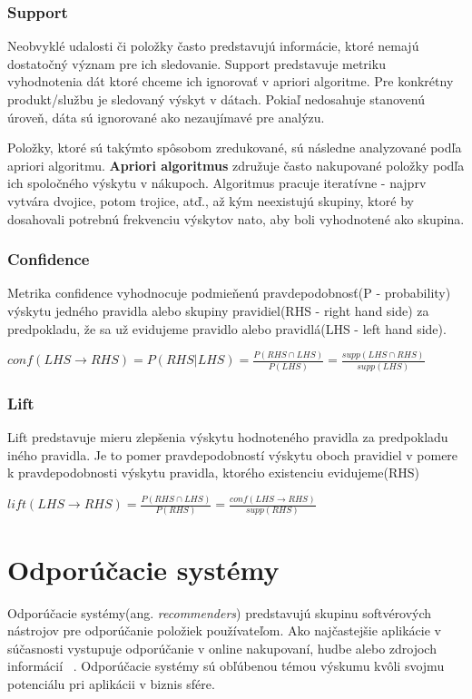\subsubsection{Support}
\label{support}
Neobvyklé udalosti či položky často predstavujú informácie, ktoré nemajú dostatočný význam pre ich sledovanie. Support predstavuje metriku vyhodnotenia dát ktoré chceme ich ignorovať v apriori algoritme. Pre konkrétny produkt/službu je sledovaný výskyt v dátach. Pokiaľ nedosahuje stanovenú úroveň, dáta sú ignorované ako nezaujímavé pre analýzu.

Položky, ktoré sú takýmto spôsobom zredukované, sú následne analyzované podľa apriori algoritmu. \textbf{Apriori algoritmus} združuje často nakupované položky podľa ich spoločného výskytu v nákupoch. Algoritmus pracuje iteratívne - najprv vytvára dvojice, potom trojice, atď., až kým neexistujú skupiny, ktoré by dosahovali potrebnú frekvenciu výskytov nato, aby boli vyhodnotené ako skupina.

\subsubsection{Confidence}
\label{confidence}
Metrika confidence vyhodnocuje podmieňenú pravdepodobnosť(P - probability) výskytu jedného pravidla alebo skupiny pravidiel(RHS - right hand side) za predpokladu, že sa už evidujeme pravidlo alebo pravidlá(LHS - left hand side).

$conf(LHS\to RHS) = P(RHS | LHS) = \frac{P(RHS \cap LHS)}{P(LHS)} = \frac{supp(LHS\cap RHS)}{supp(LHS)}$

\subsubsection{Lift}
\label{lift}
Lift predstavuje mieru zlepšenia výskytu hodnoteného pravidla za predpokladu iného pravidla. Je to pomer pravdepodobností výskytu oboch pravidiel v pomere k pravdepodobnosti výskytu pravidla, ktorého existenciu evidujeme(RHS)

$lift(LHS\to RHS) = \frac{P(RHS \cap LHS)}{P(RHS)} = \frac{conf(LHS\to RHS)}{supp(RHS)}$


\section{Odporúčacie systémy}
\label{odporucacie_systemy}

Odporúčacie systémy(ang. \textit{recommenders}) predstavujú skupinu softvérových nástrojov pre odporúčanie položiek používateľom. Ako najčastejšie aplikácie v súčasnosti vystupuje odporúčanie v online nakupovaní, hudbe alebo zdrojoch informácií ~\cite{ricci2011introduction}. Odporúčacie systémy sú obľúbenou témou výskumu kvôli svojmu potenciálu pri aplikácii v biznis sfére.

